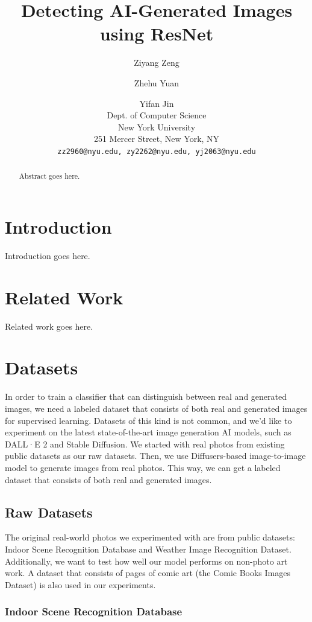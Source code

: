 \documentclass[11pt]{article}
\title{Detecting AI-Generated Images using ResNet}
\author{Ziyang Zeng \and Zhehu Yuan \and Yifan Jin \\
  Dept. of Computer Science \\
  New York University \\
  251 Mercer Street, New York, NY \\
  \texttt{zz2960@nyu.edu, zy2262@nyu.edu, yj2063@nyu.edu}}
\begin{document}
\maketitle
\begin{abstract}
  Abstract goes here.
\end{abstract}

\section{Introduction}

Introduction goes here.


\section{Related Work}

Related work goes here.

\section{Datasets}

In order to train a classifier that can distinguish between real and generated images, we need a labeled dataset that consists  of both real and generated images for supervised learning. Datasets of this kind is not common, and we'd like to experiment on the latest state-of-the-art image generation AI models, such as DALL·E 2 and Stable Diffusion. We started with real photos from existing public datasets as our raw datasets. Then, we use Diffusers-based image-to-image model to generate images from real photos. This way, we can get a labeled dataset that consists of both real and generated images.

\subsection{Raw Datasets}

The original real-world photos we experimented with are from public datasets: Indoor Scene Recognition Database and Weather Image Recognition Dataset. Additionally, we want to test how well our model performs on non-photo art work. A dataset that consists of pages of comic art (the Comic Books Images Dataset) is also used in our experiments.

\subsubsection{Indoor Scene Recognition Database}
\end{document}
